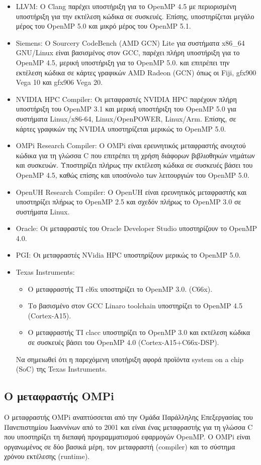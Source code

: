 \begin{itemize}
	\item LLVM: Ο Clang παρέχει υποστήριξη για το OpenMP 4.5 με περιορισμένη υποστήριξη για την εκτέλεση κώδικα σε συσκευές. Επίσης, υποστηρίζεται μεγάλο μέρος του OpenMP 5.0 και μικρό μέρος του OpenMP 5.1.
	\item Siemens: Ο Sourcery CodeBench (AMD GCN) Lite για συστήματα x86\_64 GNU/Linux είναι βασισμένος στον GCC, παρέχει πλήρη υποστήριξη για το OpenMP 4.5, μερική υποστήριξη για το OpenMP 5.0. και επιτρέπει την εκτέλεση κώδικα σε κάρτες γραφικών AMD Radeon (GCN) όπως οι Fiji, gfx900 Vega 10 και gfx906 Vega 20.	
	\item NVIDIA HPC Compiler: Οι μεταφραστές NVIDIA HPC παρέχουν πλήρη υποστήριξη του OpenMP 3.1 και μερική υποστήριξη του OpenMP 5.0 για συστήματα Linux/x86-64, Linux/OpenPOWER, Linux/Arm. Επίσης, σε κάρτες γραφικών της NVIDIA υποστηρίζεται μερικώς το OpenMP 5.0.
	\item OMPi Research Compiler: Ο OMPi είναι ερευνητικός μεταφραστής ανοιχτού κώδικα για τη γλώσσα C που επιτρέπει τη χρήση διάφορων βιβλιοθηκών νημάτων και συσκευών. Υποστηρίζει πλήρως την εκτέλεση κώδικα σε συσκευές βάσει του OpenMP 4.5, καθώς επίσης και υποσύνολο των λειτουργιών του OpenMP 5.0.
	\item OpenUH Research Compiler: Ο OpenUH είναι ερευνητικός μεταφραστής και υποστηρίζει πλήρως το OpenMP 2.5 και σχεδόν πλήρως το OpenMP 3.0 σε συστήματα Linux.
	\item Oracle: Οι μεταφραστές του Oracle Developer Studio υποστηρίζουν το OpenMP 4.0.
	\item PGI: Οι μεταφραστές NVidia HPC υποστηρίζουν μερικώς το OpenMP 5.0.
	\item Texas Instruments:
		\begin{itemize}
			\item Ο μεταφραστής TI cl6x υποστηρίζει το OpenMP 3.0. (C66x).
			\item Το βασισμένο στον GCC Linaro toolchain υποστηρίζει το OpenMP 4.5 (Cortex-A15).
			\item Ο μεταφραστής TI clacc υποστηρίζει το OpenMP 3.0 και εκτέλεση κώδικα σε συσκευές βάσει του OpenMP 4.0 (Cortex-A15+C66x-DSP).
		\end{itemize}
		Να σημειωθεί ότι η παρεχόμενη υποτήριξη αφορά προϊόντα system on a chip (SoC) της Texas Instruments.
\end{itemize}


\subsection{Ο μεταφραστής OMPi}
Ο μεταφραστής OMPi αναπτύσσεται από την Ομάδα Παράλληλης Επεξεργασίας του Πανεπιστημίου Ιωαννίνων από το 2001 και είναι ένας μεταφραστής για τη γλώσσα C που υποστηρίζει τη διεπαφή προγραμματισμού εφαρμογών OpenMP. Ο OMPi είναι οργανωμένος σε δύο βασικά μέρη, τον μεταφραστή (compiler) και το σύστημα χρόνου εκτέλεσης (runtime).

